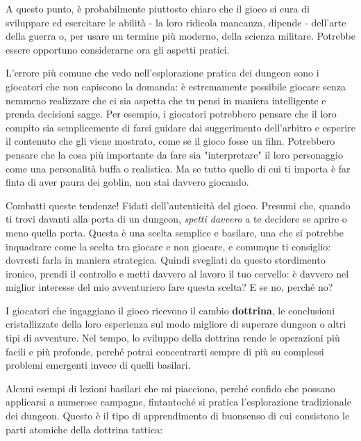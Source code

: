 
A questo punto, è probabilmente piuttosto chiaro che il gioco si cura di sviluppare ed esercitare le abilità - la loro ridicola mancanza, dipende - dell'arte della guerra o, per usare un termine più moderno, della scienza militare. Potrebbe essere opportuno considerarne ora gli aspetti pratici.


L'errore più comune che vedo nell'esplorazione pratica dei dungeon sono i giocatori che non capiscono la domanda: è estremamente possibile giocare senza nemmeno realizzare che ci sia aspetta che tu pensi in maniera intelligente e prenda decisioni sagge. Per esempio, i giocatori potrebbero pensare che il loro compito sia semplicemente di farsi guidare dai suggerimento dell'arbitro e esperire il contenuto che gli viene mostrato, come se il gioco fosse un film. Potrebbero pensare che la cosa più importante da fare sia "interpretare" il loro personaggio come una personalità buffa o realistica. Ma se tutto quello di cui ti importa è far finta di aver paura dei goblin, non stai davvero giocando.

Combatti queste tendenze! Fidati dell'autenticità del gioco. Presumi che, quando ti trovi davanti alla porta di un dungeon, \textit{spetti davvero} a te decidere se aprire o meno quella porta. Questa è una scelta semplice e basilare, una che si potrebbe inquadrare come la scelta tra giocare e non giocare, e comunque ti consiglio: dovresti farla in maniera strategica. Quindi svegliati da questo stordimento ironico, prendi il controllo e metti davvero al lavoro il tuo cervello: è davvero nel miglior interesse del mio avventuriero fare questa scelta? E se no, perché no?

I giocatori che ingaggiano il gioco ricevono il cambio \textbf{dottrina}, le conclusioni cristallizzate della loro esperienza sul modo migliore di superare dungeon o altri tipi di avventure. Nel tempo, lo sviluppo della dottrina rende le operazioni più facili e più profonde, perché potrai concentrarti sempre di più su complessi problemi emergenti invece di quelli basilari.


Alcuni esempi di lezioni basilari che mi piacciono, perché confido che possano applicarsi a numerose campagne, fintantoché si pratica l'esplorazione tradizionale dei dungeon. Questo è il tipo di apprendimento di buonsenso di cui consistono le parti atomiche della dottrina tattica:

